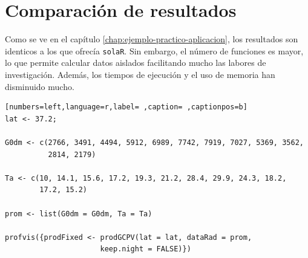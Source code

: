 \section{Comparación de resultados}
\label{sec:org2972e6a}
Como se ve en el capítulo \ref{chap:ejemplo-practico-aplicacion}, los resultados son identicos a los que ofrecía \texttt{solaR}. Sin embargo, el número de funciones es mayor, lo que permite calcular datos aislados facilitando mucho las labores de investigación. Además, los tiempos de ejecución y el uso de memoria han disminuido mucho.
\begin{lstlisting}[numbers=left,language=r,label= ,caption= ,captionpos=b]
lat <- 37.2;

G0dm <- c(2766, 3491, 4494, 5912, 6989, 7742, 7919, 7027, 5369, 3562,
          2814, 2179)

Ta <- c(10, 14.1, 15.6, 17.2, 19.3, 21.2, 28.4, 29.9, 24.3, 18.2,
        17.2, 15.2)

prom <- list(G0dm = G0dm, Ta = Ta)

profvis({prodFixed <- prodGCPV(lat = lat, dataRad = prom,
                      keep.night = FALSE)})
\end{lstlisting}

